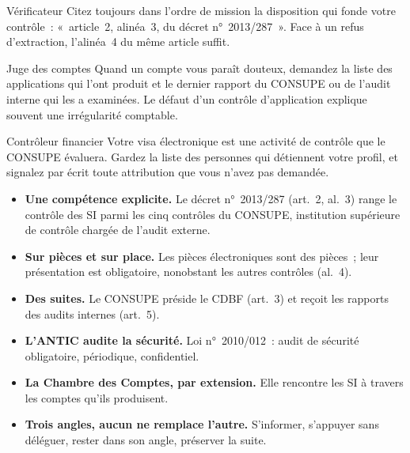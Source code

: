 \begin{boxmetier}{Vérificateur}
Citez toujours dans l'ordre de mission la disposition qui fonde votre
contrôle~: «~article~2, alinéa~3, du décret n°~2013/287~». Face à un
refus d'extraction, l'alinéa~4 du même article suffit.
\end{boxmetier}

\begin{boxmetier}{Juge des comptes}
Quand un compte vous paraît douteux, demandez la liste des applications
qui l'ont produit et le dernier rapport du CONSUPE ou de l'audit interne
qui les a examinées. Le défaut d'un contrôle d'application explique
souvent une irrégularité comptable.
\end{boxmetier}

\begin{boxmetier}{Contrôleur financier}
Votre visa électronique est une activité de contrôle que le CONSUPE
évaluera. Gardez la liste des personnes qui détiennent votre profil, et
signalez par écrit toute attribution que vous n'avez pas demandée.
\end{boxmetier}

\separateur

\begin{boxresume}
\begin{itemize}
    \item \textbf{Une compétence explicite.} Le décret n°~2013/287 (art.~2,
          al.~3) range le contrôle des SI parmi les cinq contrôles du
          CONSUPE, institution supérieure de contrôle chargée de l'audit
          externe.
    \item \textbf{Sur pièces et sur place.} Les pièces électroniques sont
          des pièces~; leur présentation est obligatoire, nonobstant les
          autres contrôles (al.~4).
    \item \textbf{Des suites.} Le CONSUPE préside le CDBF (art.~3) et reçoit
          les rapports des audits internes (art.~5).
    \item \textbf{L'ANTIC audite la sécurité.} Loi n°~2010/012~: audit de
          sécurité obligatoire, périodique, confidentiel.
    \item \textbf{La Chambre des Comptes, par extension.} Elle rencontre les
          SI à travers les comptes qu'ils produisent.
    \item \textbf{Trois angles, aucun ne remplace l'autre.} S'informer,
          s'appuyer sans déléguer, rester dans son angle, préserver la
          suite.
\end{itemize}
\end{boxresume}

